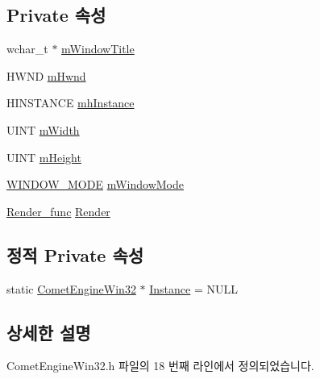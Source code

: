 \subsection*{Private 속성}
\begin{DoxyCompactItemize}
\item 
wchar\+\_\+t $\ast$ \hyperlink{class_comet_engine_1_1_comet_engine_win32_a63ee29dd5d917889a0e7b644fea26d06}{m\+Window\+Title}
\item 
H\+W\+ND \hyperlink{class_comet_engine_1_1_comet_engine_win32_a31c6576456c4bfea9672c5198aa18460}{m\+Hwnd}
\item 
H\+I\+N\+S\+T\+A\+N\+CE \hyperlink{class_comet_engine_1_1_comet_engine_win32_a699a17c72a7b5416a8966df051f9c752}{mh\+Instance}
\item 
U\+I\+NT \hyperlink{class_comet_engine_1_1_comet_engine_win32_a954be7feb8f6558f86a08a30d640013e}{m\+Width}
\item 
U\+I\+NT \hyperlink{class_comet_engine_1_1_comet_engine_win32_ae5ce9d2610ee7e9675a4ecc74b0c9492}{m\+Height}
\item 
\hyperlink{namespace_comet_engine_abdc5ec13bf1dfb1d26eb0bcc9da0ddad}{W\+I\+N\+D\+O\+W\+\_\+\+M\+O\+DE} \hyperlink{class_comet_engine_1_1_comet_engine_win32_a31fa5cdc3ed0a81919f9ae7ec61844d1}{m\+Window\+Mode}
\item 
\hyperlink{class_comet_engine_1_1_comet_engine_win32_a97e4f6f1bfb397686ef973fe8bd42abf}{Render\+\_\+func} \hyperlink{class_comet_engine_1_1_comet_engine_win32_a805efc6c9b43dd5daa64e3c1392d18b3}{Render}
\end{DoxyCompactItemize}
\subsection*{정적 Private 속성}
\begin{DoxyCompactItemize}
\item 
static \hyperlink{class_comet_engine_1_1_comet_engine_win32}{Comet\+Engine\+Win32} $\ast$ \hyperlink{class_comet_engine_1_1_comet_engine_win32_ac980c50873d6df828203b639e543de14}{Instance} = N\+U\+LL
\end{DoxyCompactItemize}


\subsection{상세한 설명}


Comet\+Engine\+Win32.\+h 파일의 18 번째 라인에서 정의되었습니다.



